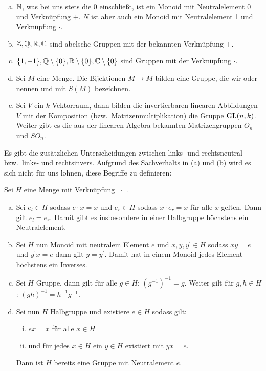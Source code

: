 \begin{beispiel}
  \begin{enumerate}[(a)]
  \item \(\mathbb{N}\), was bei uns stets die 0 einschließt, ist ein Monoid mit Neutralelement 0 und Verknüpfung \(+\). \(N\) ist aber auch ein Monoid mit Neutralelement 1 und Verknüpfung \(\cdot\).
  \item \(\mathbb{Z},\mathbb{Q},\mathbb{R},\mathbb{C}\) sind abelsche Gruppen mit der bekannten Verknüpfung \(+\).
  \item \(\{1,-1\},\mathbb{Q}\setminus\{0\},\mathbb{R}\setminus\{0\},\mathbb{C}\setminus\{0\}\) sind Gruppen mit der Verknüpfung \(\cdot\).
  \item Sei \(M\) eine Menge. Die Bijektionen \(M\to M\) bilden eine Gruppe, die wir  oder  nennen und mit \(S(M)\) bezeichnen.
  \item Sei \(V\) ein \(k\)-Vektorraum, dann bilden die invertierbaren linearen Abbildungen \(V\) mit der Komposition (bzw.\ Matrizenmultiplikation) die Gruppe \(\mathrm{GL}(n,k)\). Weiter gibt es die aus der linearen Algebra bekannten Matrizengruppen \(O_n\) und \(SO_n\).
  \end{enumerate}
\end{beispiel}

Es gibt die zusätzlichen Unterscheidungen zwischen links- und rechtsneutral bzw.\ links- und rechtsinvers. Aufgrund des Sachverhalts in (a) und (b) wird es sich nicht für uns lohnen, diese Begriffe zu definieren:

\begin{bemerkung}
  Sei \(H\) eine Menge mit Verknüpfung \(\_\cdot\_\).
  \begin{enumerate}[(a)]
  \item Sei \(e_l\in H\) sodass \(e\cdot x=x\) und \(e_r\in H\) sodass \(x\cdot e_r=x\) für alle \(x\) gelten. Dann gilt \(e_l=e_r\). Damit gibt es insbesondere in einer Halbgruppe höchstens ein Neutralelement.
  \item Sei \(H\) nun Monoid mit neutralem Element \(e\)
    und \(x,y,y^\prime\in H\) sodass \(xy=e\) und \(y^\prime x=e\) dann gilt \(y=y^\prime\). Damit hat in einem Monoid jedes Element höchstens ein Inverses.
  \item Sei \(H\) Gruppe, dann gilt für alle \(g\in H\): \((g^{-1})^{-1}=g\).
    Weiter gilt für \(g,h\in H\): \((gh)^{-1}=h^{-1}g^{-1}\).
  \item
   Sei nun \(H\) Halbgruppe und existiere \(e\in H\) sodass gilt:
   \begin{enumerate}[(i)]
   \item \(ex=x\) für alle \(x\in H\) 
   \item und für jedes \(x\in H\) ein \(y\in H\) existiert mit \(yx=e\).
   \end{enumerate}
   Dann ist \(H\) bereits eine Gruppe mit Neutralement \(e\).
  \end{enumerate}
\end{bemerkung}

